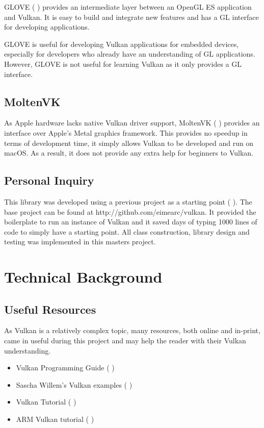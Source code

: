 \documentclass[12pt]{report}
\newcommand{\citebu}[1]{(\citenoparen{#1})}
\newcommand{\citenoparen}[1]{\citeauthor{#1} \citeyear{#1}}
\newcommand{\citesoftware}[1]{(\citeauthor{#1} \citeyear{#1})}
\theoremstyle{definition}
\begin{document}
      GLOVE \citesoftware{glove} provides an intermediate layer
      between an OpenGL ES application and Vulkan. It is easy to build and
      integrate new features and has a GL interface for developing applications.

      GLOVE is useful for developing Vulkan applications for embedded devices,
      especially for developers who already have an understanding of GL
      applications. However, GLOVE is not useful for learning Vulkan
      as it only provides a GL interface.

    \section{MoltenVK}

      As Apple hardware lacks native Vulkan driver support, MoltenVK
      \citesoftware{moltenvk} provides an interface over Apple's Metal graphics framework. This provides no
      speedup in terms of development time, it simply allows Vulkan to
      be developed and run on macOS. As a result, it does not provide any
      extra help for beginners to Vulkan.

    \section{Personal Inquiry}

      This library was developed using a previous project as a starting point \citebu{personalinquiry}.
      The base project can be found at http://github.com/eimearc/vulkan.
      It provided the boilerplate to run an instance of Vulkan and it
      saved days of typing 1000 lines of code to simply have a
      starting point. All class construction, library design
      and testing was implemented in this masters project.

  \chapter{Technical Background}

    \section{Useful Resources}

      As Vulkan is a relatively complex topic, many resources, both online and
      in-print, came in useful during this project and may help the reader
      with their Vulkan understanding.

      \begin{itemize}
        \item Vulkan Programming Guide \citebu{vulkanbook}
        \item Sascha Willem's Vulkan examples \citebu{sascha}
        \item Vulkan Tutorial \citebu{vulkantutorial}
        \item ARM Vulkan tutorial \citebu{arm}
      \end{itemize}
\end{document}
